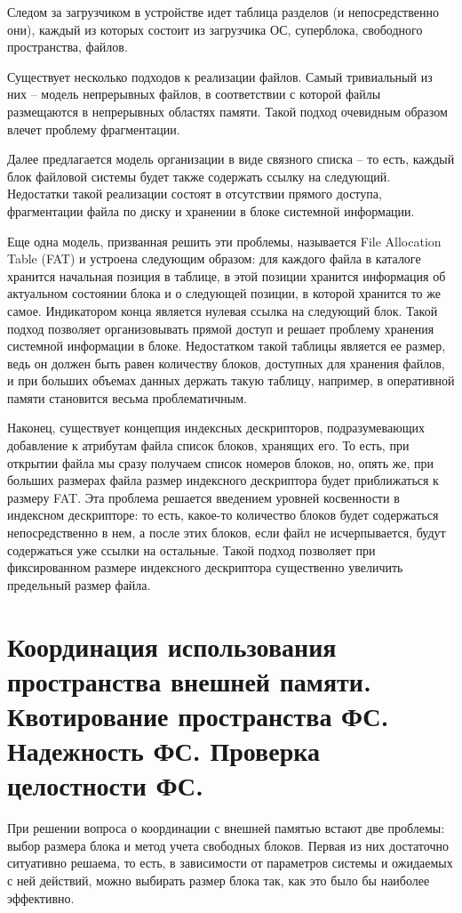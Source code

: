 \documentclass[a4paper,12pt,titlepage,finall]{article}
\begin{document}
Следом за загрузчиком в устройстве идет таблица разделов (и непосредственно они), каждый из которых состоит из загрузчика ОС, суперблока, свободного пространства, файлов.


Существует несколько подходов к реализации файлов. Самый тривиальный из них -- модель непрерывных файлов, в соответствии с которой файлы размещаются в непрерывных областях памяти. Такой подход очевидным образом влечет проблему фрагментации.

Далее предлагается модель организации в виде связного списка -- то есть, каждый блок файловой системы будет также содержать ссылку на следующий. Недостатки такой реализации состоят в отсутствии прямого доступа, фрагментации файла по диску и хранении в блоке системной информации.

Еще одна модель, призванная решить эти проблемы, называется File Allocation Table (FAT) и устроена следующим образом: для каждого файла в каталоге хранится начальная позиция в таблице, в этой позиции хранится информация об актуальном состоянии блока и о следующей позиции, в которой хранится то же самое. Индикатором конца является нулевая ссылка на следующий блок. Такой подход позволяет организовывать прямой доступ и решает проблему хранения системной информации в блоке. Недостатком такой таблицы является ее размер, ведь он должен быть равен количеству блоков, доступных для хранения файлов, и при больших объемах данных держать такую таблицу, например, в оперативной памяти становится весьма проблематичным.

Наконец, существует концепция индексных дескрипторов, подразумевающих добавление к атрибутам файла список блоков, хранящих его. То есть, при открытии файла мы сразу получаем список номеров блоков, но, опять же, при больших размерах файла размер индексного дескриптора будет приближаться к размеру FAT. Эта проблема решается введением уровней косвенности в индексном дескрипторе: то есть, какое-то количество блоков будет содержаться непосредственно в нем, а после этих блоков, если файл не исчерпывается, будут содержаться уже ссылки на остальные. Такой подход позволяет при фиксированном размере индексного дескриптора существенно увеличить предельный размер файла.

\section{Координация использования пространства внешней памяти. Квотирование
пространства ФС. Надежность ФС. Проверка целостности ФС.}
При решении вопроса о координации с внешней памятью встают две проблемы: выбор размера блока и метод учета свободных блоков. Первая из них достаточно ситуативно решаема, то есть, в зависимости от параметров системы и ожидаемых с ней действий, можно выбирать размер
блока так, как это было бы наиболее эффективно.
\end{document}
